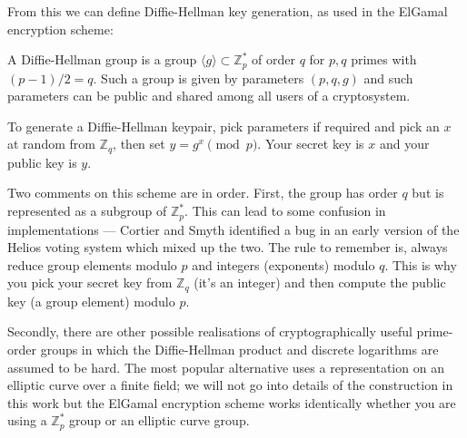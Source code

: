 \documentclass{llncs}
\begin{document}
From this we can define Diffie-Hellman key generation, as used in the ElGamal
encryption scheme:

\begin{definition}
A Diffie-Hellman group is a group $\langle g \rangle \subset \mathbb Z^*_p$ of
order $q$ for $p, q$ primes with $(p-1)/2 = q$. Such a group is given by
parameters $(p, q, g)$ and such parameters can be public and shared among all
users of a cryptosystem.

To generate a Diffie-Hellman keypair, pick parameters if required and pick an
$x$ at random from $\mathbb Z_q$, then set $y = g^x \pmod{p}$. Your secret key
is $x$ and your public key is $y$.
\end{definition}

Two comments on this scheme are in order. First, the group has order $q$ but is
represented as a subgroup of $\mathbb Z^*_p$. This can lead to some confusion
in implementations --- Cortier and Smyth \cite{CS13} identified a bug in an
early version of the Helios voting system which mixed up the two. The rule to
remember is, always reduce group elements modulo $p$ and integers (exponents)
modulo $q$. This is why you pick your secret key from $\mathbb Z_q$ (it's an
integer) and then compute the public key (a group element) modulo $p$.

Secondly, there are other possible realisations of cryptographically useful
prime-order groups in which the Diffie-Hellman product and discrete logarithms
are assumed to be hard. The most popular alternative uses a representation on an
elliptic curve over a finite field; we will not go into details of the
construction in this work but the ElGamal encryption scheme works identically
whether you are using a $\mathbb Z^*_p$ group or an elliptic curve group.
\end{document}
